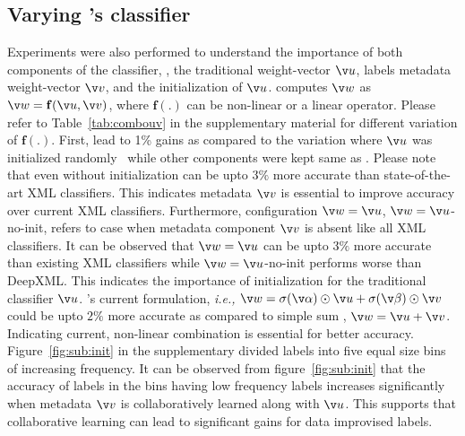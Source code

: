 \subsection{Varying \alg's classifier}
Experiments were also performed to understand the importance of both components of the classifier, \ie, the traditional weight-vector $\v u$, labels metadata weight-vector $\v v$, and the initialization of $\v u$. \alg computes $\v w$ as $\v w=\mathbf{f}(\v u, \v v)$, where $\mathbf{f}(.)$ can be non-linear or a linear operator. Please refer to Table~\ref{tab:combouv} in the supplementary material for different variation of $\mathbf{f}(.)$. First, \alg lead to 1\% gains as compared to the variation where $\v u$ was initialized randomly~\citep{glorot10} while other components were kept same as \alg. Please note that even without initialization \alg can be upto $3\%$ more accurate than state-of-the-art XML classifiers. This indicates metadata $\v v$ is essential to improve accuracy over current XML classifiers. Furthermore, configuration $\v w = \v u$, $\v w = \v u$-no-init, refers to case when metadata component $\v v$ is absent like all XML classifiers. It can be observed that $\v w = \v u$ can be upto $3\%$ more accurate than existing XML classifiers while $\v w = \v u$-no-init performs worse than DeepXML. This indicates the importance of initialization for the traditional classifier $\v u$. \alg's current formulation, {\it i.e.,} $\v w = \sigma(\v \alpha) \odot \v u + \sigma(\v \beta) \odot \v v$ could be upto $2\%$ more accurate as compared to simple sum \ie, $\v w = \v u + \v v$. Indicating current, non-linear combination is essential for better accuracy. Figure~\ref{fig:sub:init} in the supplementary divided labels into five equal size bins of increasing frequency. It can be observed from figure~\ref{fig:sub:init} that the accuracy of labels in the bins having low frequency labels increases significantly when metadata $\v v$ is collaboratively learned along with $\v u$. This supports that collaborative learning can lead to significant gains for data improvised labels.

